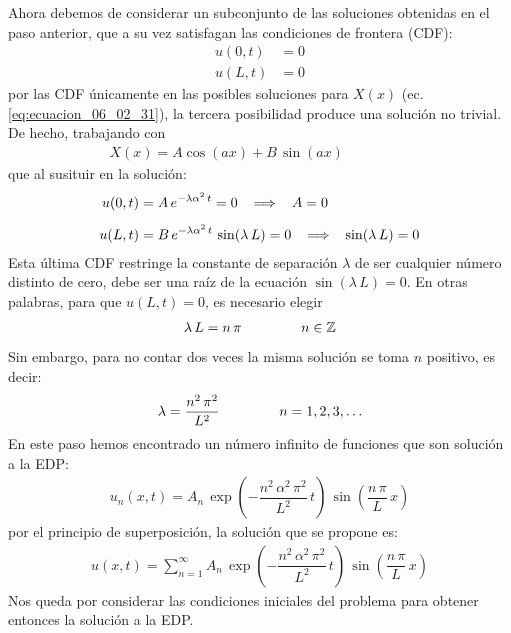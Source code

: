 Ahora debemos de considerar un subconjunto de las soluciones obtenidas en el paso anterior, que a su vez satisfagan las condiciones de frontera (CDF):
\begin{align*}
u(0, t) &= 0 \\[0.5em]
u(L, t) &= 0
\end{align*}
por las CDF únicamente en las posibles soluciones para $X(x)$ (ec. \ref{eq:ecuacion_06_02_31}), la tercera posibilidad produce una solución no trivial. De hecho, trabajando con
\begin{align*}
X(x) = A \cos (a x) + B \, \sin (a x) \hspace{2cm}
\end{align*}
que al susituir en la solución:
\begin{align*}
u(0, t) &= A \, e^{-\lambda \alpha^{2} \, t} = 0 \hspace{0.3cm} \Longrightarrow \hspace{0.3cm} A = 0 \\[0.5em]
u(L, t) &= B \, e^{-\lambda \alpha^{2} \, t} \, \sin (\lambda \, L) = 0 \hspace{0.3cm} \Longrightarrow \hspace{0.3cm} \sin (\lambda \, L) = 0
\end{align*}
Esta última CDF restringe la constante de separación $\lambda$ de ser cualquier número distinto de cero, debe ser una raíz de la ecuación $\sin (\lambda \, L) = 0$. En otras palabras, para que $u(L, t) = 0$, es necesario elegir
\begin{align}
\lambda \, L = n \, \pi \hspace{1.5cm} n \in \mathbb{Z}
\label{eq:ecuacion_06_02_34}    
\end{align}
Sin embargo, para no contar dos veces la misma solución se toma $n$ positivo, es decir:
\begin{align}
\lambda = \dfrac{n^{2} \, \pi^{2}}{L^{2}} \hspace{1.5cm} n = 1, 2, 3, \ldots
\label{eq:ecuacion_06_02_35}
\end{align}
En este paso hemos encontrado un número infinito de funciones que son solución a la EDP:
\begin{align}
u_{n} (x, t) = A_{n} \, \exp \left( - \dfrac{n^{2} \, \alpha^{2} \, \pi^{2}}{L^{2}} \, t \right) \, \sin \left( \dfrac{n \, \pi}{L} \, x \right)
\label{eq:ecuacion_06_02_37}    
\end{align}
por el principio de superposición, la solución que se propone es:
\begin{align}
u (x, t) = \sum_{n=1}^{\infty} A_{n} \, \exp \left( - \dfrac{n^{2} \, \alpha^{2} \, \pi^{2}}{L^{2}} \, t \right) \, \sin \left( \dfrac{n \, \pi}{L} \, x \right)
\label{eq:ecuacion_06_02_38}
\end{align}
Nos queda por considerar las condiciones iniciales del problema para obtener entonces la solución a la EDP.
